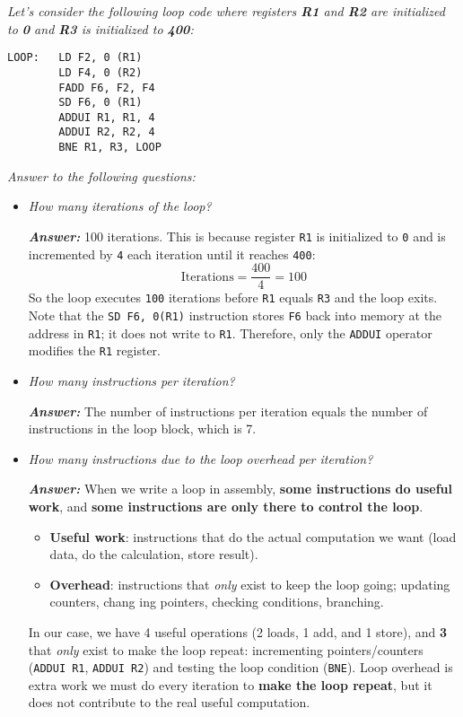 \emph{Let's consider the following loop code where registers \textbf{R1} and \textbf{R2} are initialized to \textbf{0} and \textbf{R3} is initialized to \textbf{400}:}
\begin{lstlisting}
LOOP:   LD F2, 0 (R1)
        LD F4, 0 (R2)
        FADD F6, F2, F4
        SD F6, 0 (R1)
        ADDUI R1, R1, 4
        ADDUI R2, R2, 4
        BNE R1, R3, LOOP
\end{lstlisting}
\emph{Answer to the following questions:}
\begin{itemize}
    \item \emph{How many iterations of the loop?}

    \textcolor{Green3}{\textbf{\emph{Answer:}}} 100 iterations. This is because register \texttt{R1} is initialized to \texttt{0} and is incremented by \texttt{4} each iteration until it reaches \texttt{400}:
    \begin{equation*}
        \text{Iterations} = \dfrac{400}{4} = 100
    \end{equation*}
    So the loop executes \texttt{100} iterations before \texttt{R1} equals \texttt{R3} and the loop exits. Note that the \texttt{SD F6, 0(R1)} instruction stores \texttt{F6} back into memory at the address in \texttt{R1}; it does not write to \texttt{R1}. Therefore, only the \texttt{ADDUI} operator modifies the \texttt{R1} register.


    \item \emph{How many instructions per iteration?}

    \textcolor{Green3}{\textbf{\emph{Answer:}}} The number of instructions per iteration equals the number of instructions in the loop block, which is 7.
    
    
    \item \emph{How many instructions due to the loop overhead per iteration?}

    \textcolor{Green3}{\textbf{\emph{Answer:}}} When we write a loop in assembly, \textbf{some instructions do useful work}, and \textbf{some instructions are only there to control the loop}.
    \begin{itemize}
        \item \textbf{Useful work}: instructions that do the actual computation we want (load data, do the calculation, store result).
        \item \textbf{Overhead}: instructions that \emph{only} exist to keep the loop going; updating counters, chang
        ing pointers, checking conditions, branching.
    \end{itemize}
    In our case, we have 4 useful operations (2 loads, 1 add, and 1 store), and \textbf{3} that \emph{only} exist to make the loop repeat: incrementing pointers/counters (\texttt{ADDUI R1}, \texttt{ADDUI R2}) and testing the loop condition (\texttt{BNE}). Loop overhead is extra work we must do every iteration to \textbf{make the loop repeat}, but it does not contribute to the real useful computation.
    

\end{itemize}
